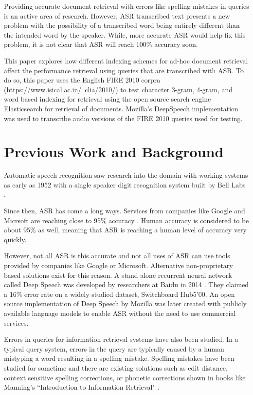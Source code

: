 \documentclass[jair, twoside,11pt,theapa]{article}
\begin{document}
Providing accurate document retrieval with errors like spelling mistakes in queries is an active area of research. However, ASR transcribed text presents a new problem with the possibility of a transcribed word being entirely different than the intended word by the speaker. While, more accurate ASR would help fix this problem, it is not clear that ASR will reach 100\% accuracy soon. 

This paper explores how different indexing schemes for ad-hoc document retrieval affect the performance retrieval using queries that are transcribed with ASR. To do so, this paper uses the English FIRE 2010 corpra (https://www.isical.ac.in/~clia/2010/) to test character 3-gram, 4-gram, and word based indexing for retrieval using the open source search engine Elasticsearch for retrieval of documents. Mozilla's DeepSpeech implementation \cite{mozilla} was used to transcribe audio versions of the FIRE 2010 queries used for testing. 



\section{Previous Work and Background}
\label{Background}
Automatic speech recognition saw research into the domain with working systems as early as 1952 with a single speaker digit recognition system built by Bell Labs \cite{AsrHistory}.  %

Since then, ASR has come a long ways. Services from companies like Google and Micrsoft are reaching close to 95\% accuracy \cite{Meeker} \cite{MS-human-accuracy}. Human accuracy is considered to be about 95\% \cite{MS-human-accuracy} as well, meaning that ASR is reaching a human level of accuracy very quickly. 

However, not all ASR is this accurate and not all uses of ASR can use tools provided by companies like Google or Microsoft. Alternative non-proprietary based solutions exist for this reason. A stand alone recurrent neural network called Deep Speech was developed by researchers at Baidu in 2014 \cite{Baidu-deep}. They claimed a 16\% error rate on a widely studied dataset, Switchboard Hub5'00. An open source implementation of Deep Speech by Mozilla \cite{mozilla} was later created with publicly available language models to enable ASR without the need to use commercial services. 

Errors in queries for information retrieval systems have also been studied. In a typical query system, errors in the query are typically caused by a human mistyping a word resulting in a spelling mistake. Spelling mistakes have been studied for sometime and there are existing solutions such as edit distance, context sensitive spelling corrections, or phonetic corrections shown in books like Manning's ``Introduction to Information Retrieval" \cite{IntroductionIR}. 
\end{document}
